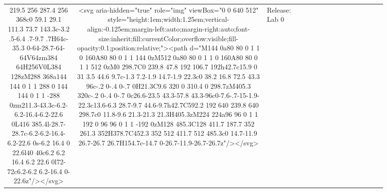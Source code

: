 \documentclass[
]{article}
\begin{document}
\begin{figure*}
\begin{longtable*}{cclllccccccccccl}
219.5 256 287.4 256 368c0 59.1 29.1 111.3 73.7 143.3c-3.2 .5-6.4 .7-9.7 .7H64c-35.3 0-64-28.7-64-64V64zm384 64H256V0L384 128zM288 368a144 144 0 1 1 288 0 144 144 0 1 1 -288 0zm211.3-43.3c-6.2-6.2-16.4-6.2-22.6 0L416 385.4l-28.7-28.7c-6.2-6.2-16.4-6.2-22.6 0s-6.2 16.4 0 22.6l40 40c6.2 6.2 16.4 6.2 22.6 0l72-72c6.2-6.2 6.2-16.4 0-22.6z"/></svg> & <svg aria-hidden="true" role="img" viewBox="0 0 640 512" style="height:1em;width:1.25em;vertical-align:-0.125em;margin-left:auto;margin-right:auto;font-size:inherit;fill:currentColor;overflow:visible;fill-opacity:0.1;position:relative;"><path d="M144 0a80 80 0 1 1 0 160A80 80 0 1 1 144 0zM512 0a80 80 0 1 1 0 160A80 80 0 1 1 512 0zM0 298.7C0 239.8 47.8 192 106.7 192h42.7c15.9 0 31 3.5 44.6 9.7c-1.3 7.2-1.9 14.7-1.9 22.3c0 38.2 16.8 72.5 43.3 96c-.2 0-.4 0-.7 0H21.3C9.6 320 0 310.4 0 298.7zM405.3 320c-.2 0-.4 0-.7 0c26.6-23.5 43.3-57.8 43.3-96c0-7.6-.7-15-1.9-22.3c13.6-6.3 28.7-9.7 44.6-9.7h42.7C592.2 192 640 239.8 640 298.7c0 11.8-9.6 21.3-21.3 21.3H405.3zM224 224a96 96 0 1 1 192 0 96 96 0 1 1 -192 0zM128 485.3C128 411.7 187.7 352 261.3 352H378.7C452.3 352 512 411.7 512 485.3c0 14.7-11.9 26.7-26.7 26.7H154.7c-14.7 0-26.7-11.9-26.7-26.7z"/></svg> & Release: Lab 0 \\ 

\end{longtable*}
\end{figure*}
\end{document}
